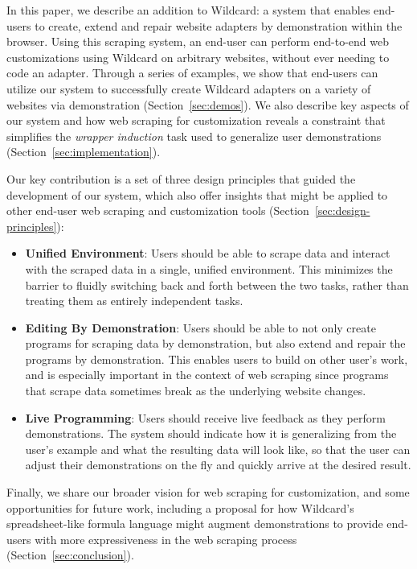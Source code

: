 \documentclass[sigconf,10pt]{acmart}
\providecommand{\tightlist}{%
  \setlength{\itemsep}{0pt}\setlength{\parskip}{0pt}}
\begin{document}
In this paper, we describe an addition to Wildcard: a system that
enables end-users to create, extend and repair website adapters by
demonstration within the browser. Using this scraping system, an
end-user can perform end-to-end web customizations using Wildcard on
arbitrary websites, without ever needing to code an adapter. Through a
series of examples, we show that end-users can utilize our system to
successfully create Wildcard adapters on a variety of websites via
demonstration (Section~\ref{sec:demos}). We also describe key aspects of
our system and how web scraping for customization reveals a constraint
that simplifies the \emph{wrapper induction} \citep{kushmerick2000} task
used to generalize user demonstrations
(Section~\ref{sec:implementation}).

Our key contribution is a set of three design principles that guided the
development of our system, which also offer insights that might be
applied to other end-user web scraping and customization tools
(Section~\ref{sec:design-principles}):

\begin{itemize}
\tightlist
\item
  \textbf{Unified Environment}: Users should be able to scrape data and
  interact with the scraped data in a single, unified environment. This
  minimizes the barrier to fluidly switching back and forth between the
  two tasks, rather than treating them as entirely independent tasks.
\item
  \textbf{Editing By Demonstration}: Users should be able to not only
  create programs for scraping data by demonstration, but also extend
  and repair the programs by demonstration. This enables users to build
  on other user's work, and is especially important in the context of
  web scraping since programs that scrape data sometimes break as the
  underlying website changes.
\item
  \textbf{Live Programming}: Users should receive live feedback as they
  perform demonstrations. The system should indicate how it is
  generalizing from the user's example and what the resulting data will
  look like, so that the user can adjust their demonstrations on the fly
  and quickly arrive at the desired result.
\end{itemize}

Finally, we share our broader vision for web scraping for customization,
and some opportunities for future work, including a proposal for how
Wildcard's spreadsheet-like formula language might augment
demonstrations to provide end-users with more expressiveness in the web
scraping process (Section~\ref{sec:conclusion}).
\end{document}
